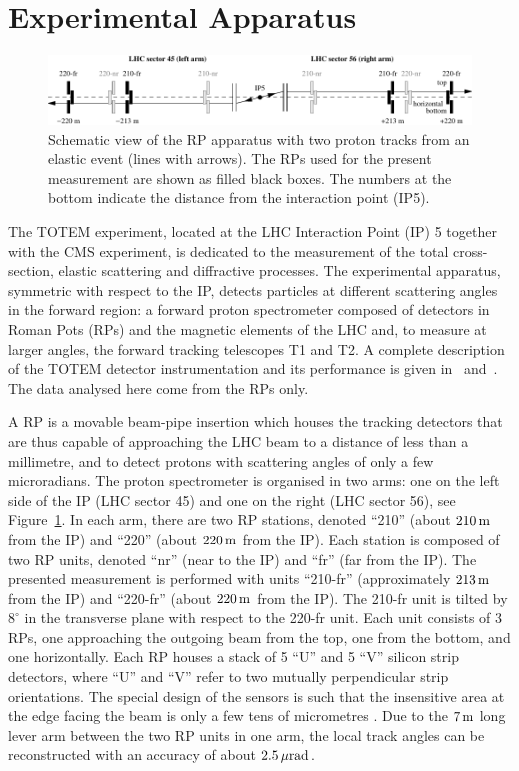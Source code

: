 \section{Experimental Apparatus}
\label{sec:exp apparatus}

\begin{figure}
\begin{center}
\includegraphics{fig/elastic_principle.pdf}
\caption{%
Schematic view of the RP apparatus with two proton tracks from an elastic event (lines with arrows). The RPs used for the present measurement are shown as filled black boxes. The numbers at the bottom indicate the distance from the interaction point (IP5).
}
\label{fig:rpsketch}
\end{center}
\end{figure}

The TOTEM experiment, located at the LHC Interaction Point (IP) 5 together with the CMS experiment, is dedicated to the measurement of the total cross-section, elastic scattering and diffractive processes. The experimental apparatus, symmetric with respect to the IP, detects particles at different scattering angles in the forward region: a forward proton spectrometer composed of detectors in Roman Pots (RPs) and the magnetic elements of the LHC and, to measure at larger angles, the forward tracking telescopes T1 and T2. A complete description of the TOTEM detector instrumentation and its performance is given in~\cite{totem-jinst} and~\cite{totem-ijmp}. The data analysed here come from the RPs only. 

A RP is a movable beam-pipe insertion which houses the tracking detectors that are thus capable of approaching the LHC beam to a distance of less than a millimetre, and to detect protons with scattering angles of only a few microradians. The proton spectrometer is organised in two arms: one on the left side of the IP (LHC sector 45) and one on the right (LHC sector 56), see Figure~\ref{fig:rpsketch}. In each arm, there are two RP stations, denoted ``210'' (about $210\,{\rm m}$ from the IP) and ``220'' (about $220\,{\rm m}$ from the IP). Each station is composed of two RP units, denoted ``nr'' (near to the IP) and ``fr'' (far from the IP). The presented measurement is performed with units ``210-fr'' (approximately $213\,{\rm m}$ from the IP) and ``220-fr'' (about $220\,{\rm m}$ from the IP). The 210-fr unit is tilted by $8^\circ$ in the transverse plane with respect to the 220-fr unit. Each unit consists of 3 RPs, one approaching the outgoing beam from the top, one from the bottom, and one horizontally. Each RP houses a stack of 5 ``U'' and 5 ``V'' silicon strip detectors, where ``U'' and ``V'' refer to two mutually perpendicular strip orientations. The special design of the sensors is such that the insensitive area at the edge facing the beam is only a few tens of micrometres \cite{edgeless-strips}. Due to the $7\,{\rm m}$ long lever arm between the two RP units in one arm, the local track angles can be reconstructed with an accuracy  of about $2.5\,{\rm \mu rad}$.

